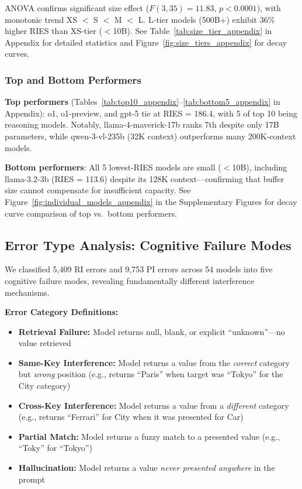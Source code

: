 \documentclass{article}
\begin{document}
ANOVA confirms significant size effect ($F(3, 35) = 11.83$, $p < 0.0001$), with monotonic trend XS $<$ S $<$ M $<$ L. L-tier models (500B+) exhibit 36\% higher RIES than XS-tier ($<$10B). See Table~\ref{tab:size_tier_appendix} in Appendix for detailed statistics and Figure~\ref{fig:size_tiers_appendix} for decay curves.

\subsubsection{Top and Bottom Performers}

\textbf{Top performers} (Tables~\ref{tab:top10_appendix}--\ref{tab:bottom5_appendix} in Appendix): o1, o1-preview, and gpt-5 tie at RIES = 186.4, with 5 of top 10 being reasoning models. Notably, llama-4-maverick-17b ranks 7th despite only 17B parameters, while qwen-3-vl-235b (32K context) outperforms many 200K-context models.

\textbf{Bottom performers}: All 5 lowest-RIES models are small ($<$10B), including llama-3.2-3b (RIES = 113.6) despite its 128K context---confirming that buffer size cannot compensate for insufficient capacity. See Figure~\ref{fig:individual_models_appendix} in the Supplementary Figures for decay curve comparison of top vs.\ bottom performers.

\subsection{Error Type Analysis: Cognitive Failure Modes}

We classified 5,409 RI errors and 9,753 PI errors across 54 models into five cognitive failure modes, revealing fundamentally different interference mechanisms.

\textbf{Error Category Definitions:}
\begin{itemize}[itemsep=2pt,topsep=4pt,parsep=0pt,leftmargin=*]
    \item \textbf{Retrieval Failure:} Model returns null, blank, or explicit ``unknown''---no value retrieved
    \item \textbf{Same-Key Interference:} Model returns a value from the \textit{correct} category but \textit{wrong} position (e.g., returns ``Paris'' when target was ``Tokyo'' for the City category)
    \item \textbf{Cross-Key Interference:} Model returns a value from a \textit{different} category (e.g., returns ``Ferrari'' for City when it was presented for Car)
    \item \textbf{Partial Match:} Model returns a fuzzy match to a presented value (e.g., ``Toky'' for ``Tokyo'')
    \item \textbf{Hallucination:} Model returns a value \textit{never presented anywhere} in the prompt
\end{itemize}
\end{document}
